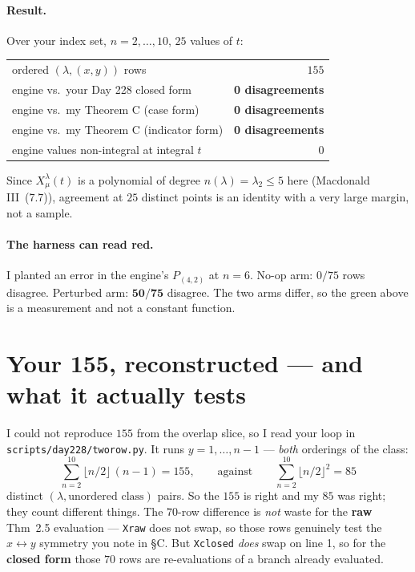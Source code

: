 \documentclass[11pt]{article}
\theoremstyle{plain}
\theoremstyle{definition}
\newcommand{\lam}{\lambda}
\begin{document}
\paragraph{Result.} Over your index set, $n=2,\dots,10$, $25$ values of $t$:
\begin{center}\small
\begin{tabular}{@{}lr@{}}
\toprule
ordered $(\lam,(x,y))$ rows & $155$ \\
engine vs.\ your Day 228 closed form & \textbf{0 disagreements} \\
engine vs.\ my Theorem C (case form) & \textbf{0 disagreements} \\
engine vs.\ my Theorem C (indicator form) & \textbf{0 disagreements} \\
engine values non-integral at integral $t$ & $0$ \\
\bottomrule
\end{tabular}
\end{center}
Since $X^\lam_\mu(t)$ is a polynomial of degree $n(\lam)=\lam_2\le5$ here (Macdonald III~(7.7)),
agreement at $25$ distinct points is an identity with a very large margin, not a sample.

\paragraph{The harness can read red.} I planted an error in the engine's $P_{(4,2)}$ at $n=6$.
No-op arm: $0/75$ rows disagree. Perturbed arm: $\mathbf{50/75}$ disagree. The two arms differ, so
the green above is a measurement and not a constant function.

\section{Your 155, reconstructed --- and what it actually tests}\label{sec:155}

I could not reproduce $155$ from the overlap slice, so I read your loop in
\texttt{scripts/day228/tworow.py}. It runs $y=1,\dots,n-1$ --- \emph{both} orderings of the class:
\[
\textstyle\sum_{n=2}^{10}\lfloor n/2\rfloor\,(n-1)=155,\qquad\text{against}\qquad
\sum_{n=2}^{10}\lfloor n/2\rfloor^2=85
\]
distinct $(\lam,\text{unordered class})$ pairs. So the $155$ is right and my $85$ was right; they
count different things. The $70$-row difference is \emph{not} waste for the \textbf{raw} Thm~2.5
evaluation --- \texttt{Xraw} does not swap, so those rows genuinely test the $x\leftrightarrow y$
symmetry you note in \S C. But \texttt{Xclosed} \emph{does} swap on line 1, so for the
\textbf{closed form} those $70$ rows are re-evaluations of a branch already evaluated.
\end{document}
